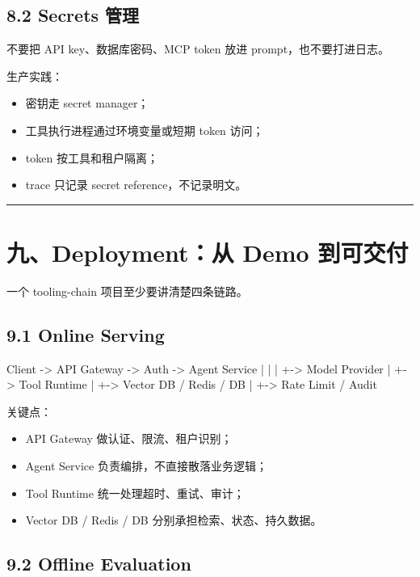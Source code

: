 \subsection{8.2 Secrets 管理}

不要把 API key、数据库密码、MCP token 放进 prompt，也不要打进日志。


生产实践：


\begin{itemize}[leftmargin=2em]
\item 密钥走 secret manager；
\item 工具执行进程通过环境变量或短期 token 访问；
\item token 按工具和租户隔离；
\item trace 只记录 secret reference，不记录明文。
\end{itemize}

\bigskip\hrule\bigskip

\section{九、Deployment：从 Demo 到可交付}

一个 tooling-chain 项目至少要讲清楚四条链路。


\subsection{9.1 Online Serving}

\begin{codeblock}
Client -> API Gateway -> Auth -> Agent Service
                         |        |
                         |        +-> Model Provider
                         |        +-> Tool Runtime
                         |        +-> Vector DB / Redis / DB
                         |
                         +-> Rate Limit / Audit
\end{codeblock}

关键点：


\begin{itemize}[leftmargin=2em]
\item API Gateway 做认证、限流、租户识别；
\item Agent Service 负责编排，不直接散落业务逻辑；
\item Tool Runtime 统一处理超时、重试、审计；
\item Vector DB / Redis / DB 分别承担检索、状态、持久数据。
\end{itemize}

\subsection{9.2 Offline Evaluation}

